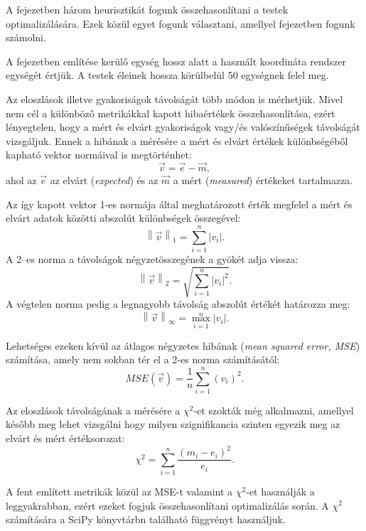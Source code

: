 
A fejezetben három heurisztikát fogunk összehasonlítani a testek optimalizálására.
Ezek közül egyet fogunk választani, amellyel  fejezetben fogunk számolni.

A fejezetben említése kerülő egység hossz alatt a használt koordináta rendszer egységét értjük.
A testek éleinek hossza körülbelül 50 egységnek felel meg.


Az eloszlások illetve gyakoriságok távolságát több módon is mérhetjük.
Mivel nem cél a különböző metrikákkal kapott hibaértékek összehasonlítása, ezért lényegtelen, hogy a mért és elvárt gyakoriságok vagy/és valószínűségek távolságát vizsgáljuk.
Ennek a hibának a mérésére a mért és elvárt értékek különbségéből kapható vektor normáival is megtörténhet:
\[
\vec{v} = \vec{e} - \vec{m},
\]
ahol az $\vec{e}$ az elvárt (\textit{expected}) és az $\vec{m}$ a mért (\textit{measured}) értékeket tartalmazza.

Az így kapott vektor 1-es normája által meghatározott érték megfelel a mért és elvárt adatok közötti abszolút különbségek összegével:
\[
\left\lVert\vec{v}\right\rVert_1 = \sum\limits_{i=1}^{n} |v_i|.
\]
A 2--es norma a távolságok négyzetösszegének a gyökét adja vissza:
\[
\left\lVert\vec{v}\right\rVert_2 = \sqrt{\sum\limits_{i=1}^{n} |v_i|^2}.
\]
A végtelen norma pedig a legnagyobb távolság abszolút értékét határozza meg:
\[
\left\lVert\vec{v}\right\rVert_\infty = \max\limits_{i=1}^{n} |v_i|.
\]

Lehetséges ezeken kívül az átlagos négyzetes hibának (\textit{mean squared error, MSE}) számítása, amely nem sokban tér el a 2-es norma számításától:
\[
MSE(\vec{v}) = \frac{1}{n} \sum_{i=1}^{n}(v_i)^2.
\]

Az eloszlások távolságának a mérésére a $\chi^2$-et szokták még alkalmazni, amellyel később meg lehet vizsgálni hogy milyen szignifikancia szinten egyezik meg az elvárt és mért értéksorozat:
\[
\chi^2=\sum_{i=1}^{n} \frac{(m_i - e_i)^2}{e_i}.
\]

A fent említett metrikák közül az MSE-t valamint a $\chi^2$-et használják a leggyakrabban, ezért ezeket fogjuk összehasonlítani optimalizálás során.
A $\chi^2$ számítására a SciPy \cite{2020SciPy-NMeth} könyvtárbn található függvényt használjuk.


